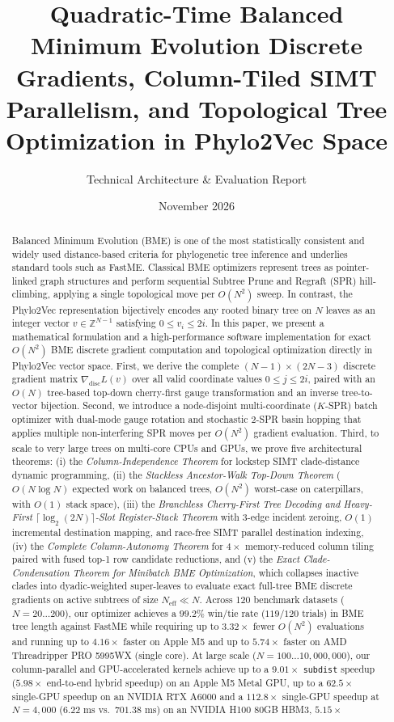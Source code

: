 \documentclass[11pt,a4paper]{article}
\title{\textbf{Quadratic-Time Balanced Minimum Evolution Discrete Gradients, Column-Tiled SIMT Parallelism, and Topological Tree Optimization in Phylo2Vec Space}}
\author{Technical Architecture \& Evaluation Report}
\date{November 2026}
\makeatletter
\DeclareRobustCommand{\_}{\ifmmode\nfss@text{\textunderscore}\else\textunderscore\allowbreak\fi}
\theoremstyle{definition}
\makeatother
\begin{document}
\maketitle

\begin{abstract}
Balanced Minimum Evolution (BME) is one of the most statistically consistent and widely used distance-based criteria for phylogenetic tree inference and underlies standard tools such as FastME. Classical BME optimizers represent trees as pointer-linked graph structures and perform sequential Subtree Prune and Regraft (SPR) hill-climbing, applying a single topological move per $O(N^2)$ sweep. In contrast, the Phylo2Vec representation bijectively encodes any rooted binary tree on $N$ leaves as an integer vector $v \in \mathbb{Z}^{N-1}$ satisfying $0 \le v_i \le 2i$. In this paper, we present a mathematical formulation and a high-performance software implementation for exact $O(N^2)$ BME discrete gradient computation and topological optimization directly in Phylo2Vec vector space. First, we derive the complete $(N-1) \times (2N-3)$ discrete gradient matrix $\nabla_{\text{disc}} L(v)$ over all valid coordinate values $0 \le j \le 2i$, paired with an $O(N)$ tree-based top-down cherry-first gauge transformation and an inverse tree-to-vector bijection. Second, we introduce a node-disjoint multi-coordinate ($K$-SPR) batch optimizer with dual-mode gauge rotation and stochastic 2-SPR basin hopping that applies multiple non-interfering SPR moves per $O(N^2)$ gradient evaluation. Third, to scale to very large trees on multi-core CPUs and GPUs, we prove five architectural theorems: (i) the \emph{Column-Independence Theorem} for lockstep SIMT clade-distance dynamic programming, (ii) the \emph{Stackless Ancestor-Walk Top-Down Theorem} ($O(N \log N)$ expected work on balanced trees, $O(N^2)$ worst-case on caterpillars, with $O(1)$ stack space), (iii) the \emph{Branchless Cherry-First Tree Decoding and Heavy-First $\lceil \log_2(2N) \rceil$-Slot Register-Stack Theorem} with 3-edge incident zeroing, $O(1)$ incremental destination mapping, and race-free SIMT parallel destination indexing, (iv) the \emph{Complete Column-Autonomy Theorem} for $4\times$ memory-reduced column tiling paired with fused top-1 row candidate reductions, and (v) the \emph{Exact Clade-Condensation Theorem for Minibatch BME Optimization}, which collapses inactive clades into dyadic-weighted super-leaves to evaluate exact full-tree BME discrete gradients on active subtrees of size $N_{\text{eff}} \ll N$. Across 120 benchmark datasets ($N = 20 \dots 200$), our optimizer achieves a $99.2\%$ win/tie rate ($119/120$ trials) in BME tree length against FastME while requiring up to $3.32\times$ fewer $O(N^2)$ evaluations and running up to $4.16\times$ faster on Apple M5 and up to $5.74\times$ faster on AMD Threadripper PRO 5995WX (single core). At large scale ($N = 100 \dots 10{,}000{,}000$), our column-parallel and GPU-accelerated kernels achieve up to a $9.01\times$ \texttt{subdist} speedup ($5.98\times$ end-to-end hybrid speedup) on an Apple M5 Metal GPU, up to a $62.5\times$ single-GPU speedup on an NVIDIA RTX A6000 and a $112.8\times$ single-GPU speedup at $N = 4{,}000$ ($6.22\text{ ms}$ vs.\ $701.38\text{ ms}$) on an NVIDIA H100 80GB HBM3, $5.15\times$ 
\end{abstract}
\end{document}
